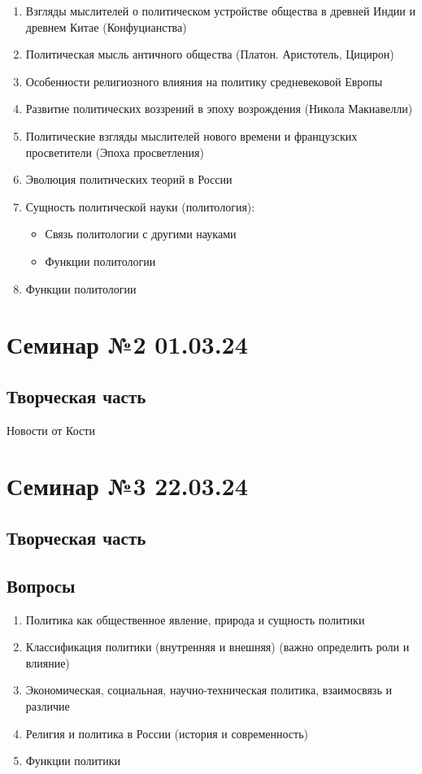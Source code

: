 \begin{enumerate}
  \item Взгляды мыслителей о политическом устройстве общества в древней Индии и древнем Китае (Конфуцианства)
  \item Политическая мысль античного общества (Платон. Аристотель, Цицирон)
  \item Особенности религиозного влияния на политику средневековой Европы
  \item Развитие политических воззрений в эпоху возрождения (Никола Макиавелли)
  \item Политические взгляды мыслителей нового времени и французских просветители (Эпоха просветления)
  \item Эволюция политических теорий в России
  \item Сущность политической науки (политология):
        \begin{itemize}
          \item Связь политологии с другими науками
          \item Функции политологии
        \end{itemize}
  \item Функции политологии
\end{enumerate}

\chapter{Семинар №2 01.03.24}

\section{Творческая часть}

Новости от Кости

\chapter{Семинар №3 22.03.24}

\section{Творческая часть}

\section{Вопросы}
\begin{enumerate}
  \item Политика как общественное явление, природа и сущность политики
  \item Классификация политики (внутренняя и внешняя) (важно определить роли и влияние)
  \item Экономическая, социальная, научно-техническая политика, взаимосвязь и различие
  \item Религия и политика в России (история и современность)
  \item Функции политики
\end{enumerate}